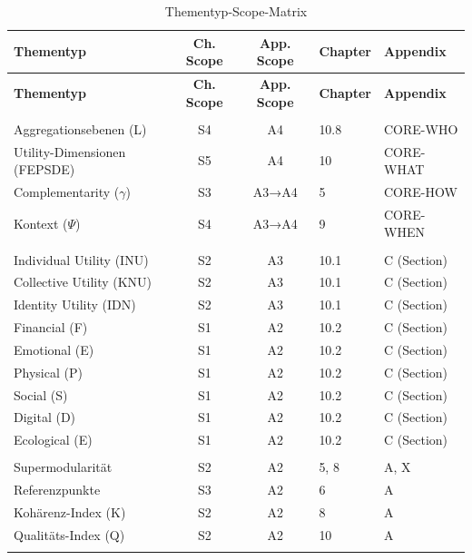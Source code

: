 \documentclass[12pt,a4paper]{article}
\begin{document}
\begin{longtable}{@{}p{4cm}ccp{3cm}p{3cm}@{}}
\caption{Thementyp-Scope-Matrix} \\
\toprule
\textbf{Thementyp} & \textbf{Ch. Scope} & \textbf{App. Scope} & \textbf{Chapter} & \textbf{Appendix} \\
\midrule
\endfirsthead
\midrule
\textbf{Thementyp} & \textbf{Ch. Scope} & \textbf{App. Scope} & \textbf{Chapter} & \textbf{Appendix} \\
\midrule
\endhead
\bottomrule
\endlastfoot

\multicolumn{5}{@{}l}{\textit{\textbf{Fundamentale Konzepte}}} \\
Aggregationsebenen (L) & S4 & A4 & 10.8 & CORE-WHO \\
Utility-Dimensionen (FEPSDE) & S5 & A4 & 10 & CORE-WHAT \\
Complementarity ($\gamma$) & S3 & A3→A4 & 5 & CORE-HOW \\
Kontext ($\Psi$) & S4 & A3→A4 & 9 & CORE-WHEN \\
\addlinespace

\multicolumn{5}{@{}l}{\textit{\textbf{Utility-Komponenten}}} \\
Individual Utility (INU) & S2 & A3 & 10.1 & C (Section) \\
Collective Utility (KNU) & S2 & A3 & 10.1 & C (Section) \\
Identity Utility (IDN) & S2 & A3 & 10.1 & C (Section) \\
Financial (F) & S1 & A2 & 10.2 & C (Section) \\
Emotional (E) & S1 & A2 & 10.2 & C (Section) \\
Physical (P) & S1 & A2 & 10.2 & C (Section) \\
Social (S) & S1 & A2 & 10.2 & C (Section) \\
Digital (D) & S1 & A2 & 10.2 & C (Section) \\
Ecological (E) & S1 & A2 & 10.2 & C (Section) \\
\addlinespace

\multicolumn{5}{@{}l}{\textit{\textbf{Mathematische Konzepte}}} \\
Supermodularität & S2 & A2 & 5, 8 & A, X \\
Referenzpunkte & S3 & A2 & 6 & A \\
Kohärenz-Index (K) & S2 & A2 & 8 & A \\
Qualitäts-Index (Q) & S2 & A2 & 10 & A \\
\addlinespace


\end{longtable}
\end{document}
